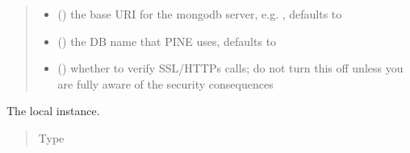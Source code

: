 \documentclass[letterpaper,10pt,english]{sphinxmanual}
\begin{document}
\begin{fulllineitems}
\begin{quote}
\begin{description}
\begin{itemize}
\item {} 
\sphinxAtStartPar
{} (\sphinxstyleliteralemphasis{\sphinxupquote{, }}) \textendash{} the base URI for the mongodb server, e.g. , defaults to 

\item {} 
\sphinxAtStartPar
{} (\sphinxstyleliteralemphasis{\sphinxupquote{, }}) \textendash{} the DB name that PINE uses, defaults to 

\item {} 
\sphinxAtStartPar
{} (\sphinxstyleliteralemphasis{\sphinxupquote{, }}) \textendash{} whether to verify SSL/HTTPs calls; do not turn this off unless you
are fully aware of the security consequences

\end{itemize}

\end{description}\end{quote}

\begin{fulllineitems}
\label{\detokenize{autoapi/pine/client/client/index:pine.client.client.LocalPineClient.eve}}
\sphinxAtStartPar
The local {\hyperref[\detokenize{autoapi/pine/client/client/index:pine.client.client.EveClient}]{}} instance.
\begin{quote}\begin{description}
\item[{Type}] \leavevmode
\sphinxAtStartPar
{\hyperref[\detokenize{autoapi/pine/client/client/index:pine.client.client.EveClient}]{}}


\end{description}
\end{quote}
\end{fulllineitems}
\end{fulllineitems}
\end{document}
